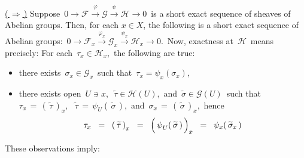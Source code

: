 \vskip 0.3cm
\noindent
\underline{(\,$\Longrightarrow$\,)}\quad
Suppose
\,$0 \longrightarrow \mathscr{F} \overset{\varphi}{\longrightarrow} \mathscr{G} \overset{\psi}{\longrightarrow} \mathscr{H} \longrightarrow 0$\,
is a short exact sequence of sheaves of Abelian groups.
Then, for each $x \in X$, the following is a short exact sequence of Abelian groups:
\,$0 \longrightarrow \mathscr{F}_{x} \overset{\varphi_{x}}{\longrightarrow} \mathscr{G}_{x} \overset{\psi_{x}}{\longrightarrow} \mathscr{H}_{x} \longrightarrow 0$.\,
Now, exactness at \,$\mathscr{H}$\, means precisely:
For each \,$\tau_{x} \in \mathscr{H}_{x}$,\, the following are true:
\begin{itemize}
\item
	there exists \,$\sigma_{x} \in \mathscr{G}_{x}$\, such that \,$\tau_{x} = \psi_{x}(\sigma_{x})$,
\item
	there exists open
	\,$U \ni x$,\, \,$\widetilde{\tau} \in \mathscr{H}(U)$,\, and \,$\widetilde{\sigma} \in \mathscr{G}(U)$\,
	such that
	\,$\tau_{x} \,=\, \left(\,\widetilde{\tau}\,\right)_{x},$\,
	\,$\widetilde{\tau} \,=\, \psi_{U}(\,\widetilde{\sigma}\,)$,\, and
	\,$\sigma_{x} \,=\, \left(\,\widetilde{\sigma}\,\right)_{x}$,\, hence
	\begin{equation*}
	\tau_{x}
	\;\; = \;\;
		\left(\,\widetilde{\tau}\,\right)_{x}
	\;\; = \;\;
		\left(\,\overset{{\color{white}.}}{\psi}_{U}(\,\widetilde{\sigma}\,)\,\right)_{x}
	\;\; = \;\;
		\psi_{x}\!\left(\,\widetilde{\sigma}_{x}\,\right)
	\end{equation*}
\end{itemize}
These observations imply:
